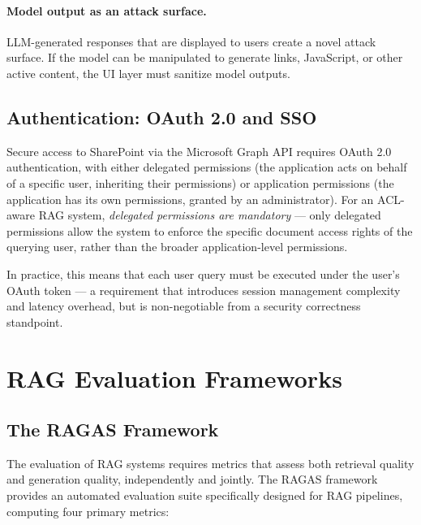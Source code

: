 \paragraph{Model output as an attack surface.} LLM-generated responses that are displayed to users create a novel attack surface. If the model can be manipulated to generate links, JavaScript, or other active content, the UI layer must sanitize model outputs.

\subsection{Authentication: OAuth 2.0 and SSO}

Secure access to SharePoint via the Microsoft Graph API requires OAuth 2.0 authentication, with either delegated permissions (the application acts on behalf of a specific user, inheriting their permissions) or application permissions (the application has its own permissions, granted by an administrator). For an ACL-aware RAG system, \textit{delegated permissions are mandatory} — only delegated permissions allow the system to enforce the specific document access rights of the querying user, rather than the broader application-level permissions.

In practice, this means that each user query must be executed under the user's OAuth token — a requirement that introduces session management complexity and latency overhead, but is non-negotiable from a security correctness standpoint.

\section{RAG Evaluation Frameworks}
\label{sec:bg-evaluation}

\subsection{The RAGAS Framework}

The evaluation of RAG systems requires metrics that assess both retrieval quality and generation quality, independently and jointly. The RAGAS framework \citep{Es2023RAGAS} provides an automated evaluation suite specifically designed for RAG pipelines, computing four primary metrics:

